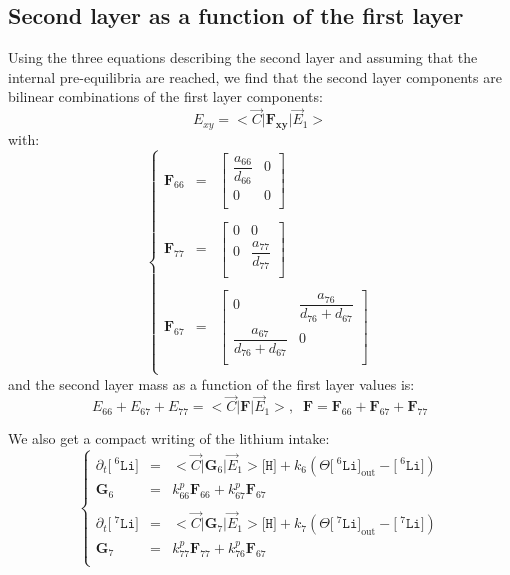 \documentclass[aps,onecolumn,11pt]{revtex4}
\newcommand{\mychem}[1]{\mathtt{#1}}
\newcommand{\myconc}[1]{\big[#1\big]}
\newcommand{\spLi}[1]{{\!~^{#1}\mychem{Li}}}
\newcommand{\Li}[1]{\myconc{\spLi{#1}}}
\newcommand{\spproton}{\mychem{H}}
\newcommand{\proton}{\myconc{\spproton}}
\newcommand{\myout}[1]{{#1}_{\mathrm{out}}}
\newcommand{\LiOut}[1]{\myout{\Li{#1}}}
\newcommand{\mymat}[1]{{\bm{#1}}}
\begin{document}
\subsection{Second layer as a function of the first layer}

Using the three equations describing the second layer and assuming that the internal pre-equilibria are reached, we find
that the second layer components are bilinear combinations of the first layer components:
\begin{equation}
\boxed{
E_{xy} = <{\vec{C}} \vert \mymat{F_{xy}} \vert \vec{E}_1 > 
}
\end{equation}
with:
\begin{equation}
\left\lbrace
\begin{array}{rcl}
\mymat{F}_{66} & = & 
\begin{bmatrix}
	\dfrac{a_{66}}{d_{66} } & 0 \\
	0 & 0\\
\end{bmatrix} \\
\\
\mymat{F}_{77} & = & 
\begin{bmatrix}
	0 & 0 \\
	0 & \dfrac{a_{77}}{d_{77} }\\
\end{bmatrix}  \\
\\
\mymat{F}_{67} & = & 
\begin{bmatrix}
	0 &\dfrac{a_{76}}{d_{76}+d_{67}}\\
	\dfrac{a_{67}}{d_{76}+d_{67}} & 0\\
\end{bmatrix} \\
\end{array}
\right.
\end{equation}
and the second layer mass as a function of the first layer values is:
\begin{equation}
E_{66} + E_{67} + E_{77} = <{\vec{C}} \vert \mymat{F} \vert \vec{E}_1 >, \;\;
 \mymat{F} 
 =  \mymat{F}_{66} + \mymat{F}_{67}  + \mymat{F}_{77}
\end{equation}

We also get a compact writing of the lithium intake:
\begin{equation}
\left\lbrace
\begin{array}{rcl}
	\partial_t \Li{6} & = & <\vec{C}|\mymat{G}_6|\vec{E}_1> \proton+ k_6\left(\Theta \LiOut{6} - \Li{6}\right)\\
	\mymat{G}_6 &= & k^p_{66} \mymat{F}_{66} + k^p_{67}\mymat{F}_{67}	\\
	\\
	\partial_t \Li{7} & = & <\vec{C}|\mymat{G}_7|\vec{E}_1> \proton + k_7\left(\Theta \LiOut{7} - \Li{7}\right)\\
	\mymat{G}_7 & = & k^p_{77} \mymat{F}_{77} + k^p_{76}\mymat{F}_{67} \\
\end{array}
\right.
\end{equation}
\end{document}
